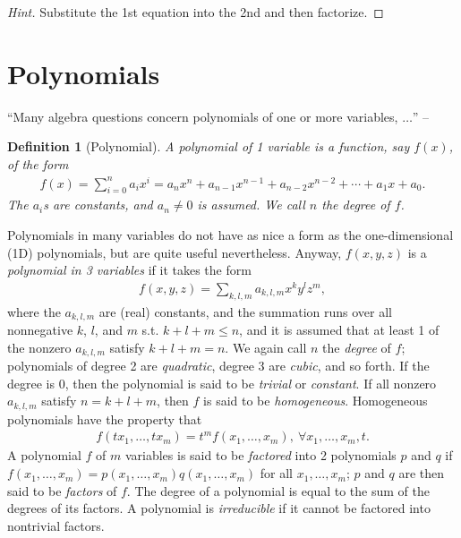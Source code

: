 \documentclass[oneside]{book}
\numberwithin{equation}{section}
\newtheorem{definition}{Definition}[section]
\begin{document}
\begin{proof}[Hint]
	Substitute the 1st equation into the 2nd and then factorize.
\end{proof}

\section{Polynomials}
``Many algebra questions concern polynomials of one or more variables, $\ldots$'' -- \cite[p. 41]{Tao2006}

\begin{definition}[Polynomial]
	A \emph{polynomial of 1 variable} is a function, say $f(x)$, of the form
	\begin{align*}
		f(x) = \sum_{i=0}^n a_ix^i = a_nx^n + a_{n-1}x^{n-1} + a_{n-2}x^{n-2} + \cdots + a_1x + a_0.
	\end{align*}
	The $a_i$s are constants, and $a_n\ne 0$ is assumed. We call $n$ the \emph{degree} of $f$.
\end{definition}
Polynomials in many variables do not have as nice a form as the one-dimensional (1D) polynomials, but are quite useful nevertheless. Anyway, $f(x,y,z)$ is a \emph{polynomial in 3 variables} if it takes the form
\begin{align*}
	f(x,y,z) = \sum_{k,l,m} a_{k,l,m}x^ky^lz^m,
\end{align*}
where the $a_{k,l,m}$ are (real) constants, and the summation runs over all nonnegative $k$, $l$, and $m$ s.t. $k + l + m\le n$, and it is assumed that at least 1 of the nonzero $a_{k,l,m}$ satisfy $k + l + m = n$. We again call $n$ the \emph{degree} of $f$; polynomials of degree 2 are \textit{quadratic}, degree 3 are \emph{cubic}, and so forth. If the degree is 0, then the polynomial is said to be \emph{trivial} or \emph{constant}. If all nonzero $a_{k,l,m}$ satisfy $n = k + l + m$, then $f$ is said to be \emph{homogeneous}. Homogeneous polynomials have the property that
\begin{align*}
	f(tx_1,\ldots,tx_m) = t^mf(x_1,\ldots,x_m),\ \forall x_1,\ldots,x_m,t.
\end{align*}
A polynomial $f$ of $m$ variables is said to be \emph{factored} into 2 polynomials $p$ and $q$ if $f(x_1,\ldots,x_m) = p(x_1,\ldots,x_m)q(x_1,\ldots,x_m)$ for all $x_1,\ldots,x_m$; $p$ and $q$ are then said to be \emph{factors} of $f$. The degree of a polynomial is equal to the sum of the degrees of its factors. A polynomial is \emph{irreducible} if it cannot be factored into nontrivial factors.
\end{document}
